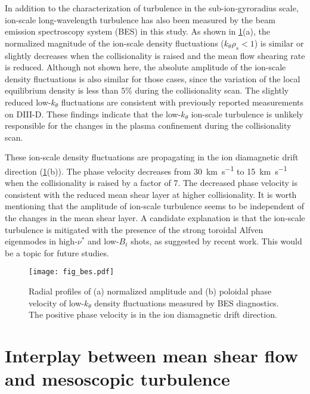 \documentclass[english,aip,pop,superscriptaddress,preprint,letterpaper]{revtex4-2}
\begin{document}
In addition to the characterization of turbulence in the sub-ion-gyroradius scale, ion-scale long-wavelength turbulence has also been measured by the beam emission spectroscopy system (BES) in this study.
As shown in \cref{fig:bes_fluct}(a), the normalized magnitude of the ion-scale density fluctuations ($k_\theta\rho_s<1$) is similar or slightly decreases when the collisionality is raised and the mean flow shearing rate is reduced.
Although not shown here, the absolute amplitude of the ion-scale density fluctuations is also similar for those cases, since the variation of the local equilibrium density is less than \(5\%\) during the collisionality scan.
The slightly reduced low-$k_{\theta}$ fluctuations are consistent with previously reported measurements on DIII-D.\cite{mordijckCollisionalityDrivenTurbulent2020}
These findings indicate that the low-$k_\theta$ ion-scale turbulence is unlikely responsible for the changes in the plasma confinement during the collisionality scan.

These ion-scale density fluctuations are propagating in the ion diamagnetic drift direction (\cref{fig:bes_fluct}(b)).
The phase velocity decreases from \SI{30}{\kilo\meter\per\second} to \SI{15}{\kilo\meter\per\second} when the collisionality is raised by a factor of 7.
The decreased phase velocity is consistent with the reduced mean shear layer at higher collisionality.
It is worth mentioning that the amplitude of ion-scale turbulence seems to be independent of the changes in the mean shear layer.
A candidate explanation is that the ion-scale turbulence is mitigated with the presence of the strong toroidal Alfven eigenmodes in high-\(\nu^*\) and low-\(B_t\) shots, as suggested by recent work.\cite{citrinOverviewTokamakTurbulence2023}
This would be a topic for future studies.

\begin{figure}
    \texttt{[image: fig\_bes.pdf]}
    \caption{\label{fig:bes_fluct} Radial profiles of (a) normalized amplitude and (b) poloidal phase velocity of low-$k_\theta$ density fluctuations measured by BES diagnostics. The positive phase velocity is in the ion diamagnetic drift direction.}
\end{figure}

\section{Interplay between mean shear flow and mesoscopic turbulence\label{sec:scaling}}
\end{document}
